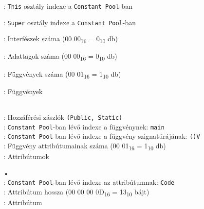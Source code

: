 \begin{compactitem}
\item {}: \lstinline{This} osztály indexe a \lstinline{Constant Pool}-ban
\item {}: \lstinline{Super} osztály indexe a \lstinline{Constant Pool}-ban
\item {}: Interfészek száma (00 00\textsubscript{16} = 0\textsubscript{10} db)
\item {}: Adattagok száma (00 00\textsubscript{16} = 0\textsubscript{10} db)
\item {}: Függvények száma (00 01\textsubscript{16} = 1\textsubscript{10} db)
\item {}: Függvények
\begin{compactitem}
    \setlength\itemsep{-5px}
    \item {}     \\
    : Hozzáférési zászlók \lstinline{(Public, Static)} \\
    : \lstinline{Constant Pool}-ban lévő indexe a függvénynek: \lstinline{main} \\
    : \lstinline{Constant Pool}-ban lévő indexe a függvény szignatúrájának: \lstinline{()V} \\
    : Függvény attribútumainak száma (00 01\textsubscript{16} = 1\textsubscript{10} db) \\
    : Attribútumok
    \begin{compactitem}
        \setlength\itemsep{-5px}
        \item[•]    \\
        : \lstinline{Constant Pool}-ban lévő indexe az attribútumnak: \lstinline{Code} \\
        : Attribútum hossza (00 00 00 0D\textsubscript{16} = 13\textsubscript{10} bájt) \\
        : Attribútum
            \begin{compactitem}

\end{compactitem}
\end{compactitem}
\end{compactitem}
\end{compactitem}
